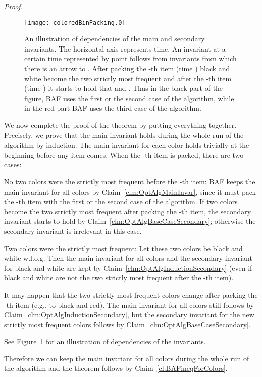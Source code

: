 \documentclass[11pt,a4paper]{article}
\begin{document}
\begin{proof}
\begin{figure}[!ht]
\centerline{\texttt{[image: coloredBinPacking.0]}}
\caption{An illustration of dependencies of the main and secondary invariants.
The horizontal axis represents time. 
An invariant at a certain time represented by point  follows from invariants from which there is an arrow to .
After packing the -th item (time ) black and white become the two strictly most frequent and
after the -th item (time ) it starts to hold that  and
.
Thus in the black part of the figure, BAF uses the first or the second case of the algorithm,
while in the red part BAF uses the third case of the algorithm.}
\label{fig:OptAlgInvariants}
\end{figure}

We now complete the proof of the theorem by putting everything together.
Precisely, we prove that the main invariant holds during
the whole run of the algorithm by induction. 
The main invariant for each color holds trivially at the beginning before any item comes.
When the -th item is packed, there are two cases:
\begin{compactitem}
\item No two colors were the strictly most frequent before the -th item:
BAF keeps the main invariant for all colors by Claim~\ref{clm:OptAlgMainInvar}, since it
must pack the -th item with the first or the second case of the algorithm.
If two colors become the two strictly most frequent after packing the -th item,
the secondary invariant starts to hold by Claim~\ref{clm:OptAlgBaseCaseSecondary};
otherwise the secondary invariant is irrelevant in this case.
\item Two colors were the strictly most frequent:
Let these two colors be black and white w.l.o.g.
Then the main invariant for all colors and the secondary invariant for black and white are kept
by Claim~\ref{clm:OptAlgInductionSecondary}
(even if black and white are not the two strictly most frequent after the -th item).

It may happen that the two strictly most frequent colors change after packing the -th item
(e.g., to black and red). The main invariant for all colors still follows by Claim~\ref{clm:OptAlgInductionSecondary},
but the secondary invariant for the new strictly most frequent colors follows by Claim~\ref{clm:OptAlgBaseCaseSecondary}.
\end{compactitem}

See Figure~\ref{fig:OptAlgInvariants} for an illustration of dependencies of the invariants.

Therefore we can keep the main invariant
 for all colors  during
the whole run of the algorithm and the theorem follows by
Claim~\ref{cl:BAFineqForColors}.
\end{proof}
\end{document}

